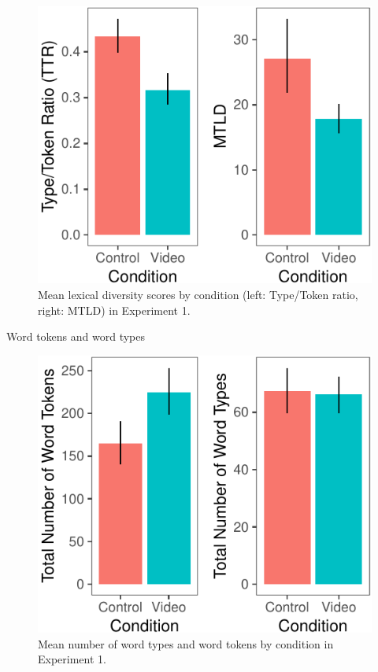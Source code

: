 \documentclass[10pt, letterpaper]{article}
\newenvironment{CodeChunk}{}{}
\begin{document}
\begin{CodeChunk}
\begin{figure}[H]

{\centering \includegraphics{figs/e1lex_div-1} 

}

\caption[Mean lexical diversity scores by condition (left]{Mean lexical diversity scores by condition (left: Type/Token ratio, right: MTLD) in Experiment 1.}\label{fig:e1lex_div}
\end{figure}
\end{CodeChunk}

Word tokens and word types

\begin{CodeChunk}
\begin{figure}[H]

{\centering \includegraphics{figs/e1token_type-1} 

}

\caption[Mean number of word types and word tokens by condition in Experiment 1]{Mean number of word types and word tokens by condition in Experiment 1.}\label{fig:e1token_type}
\end{figure}
\end{CodeChunk}
\end{document}
